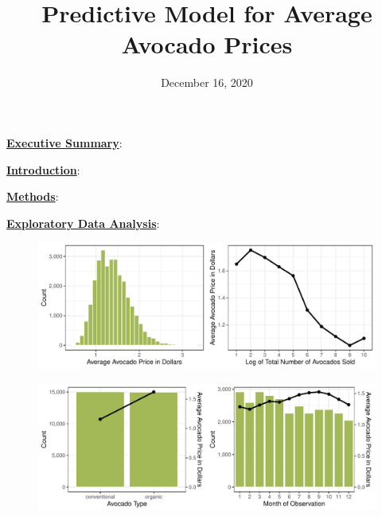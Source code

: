 \documentclass[11pt]{article}\usepackage[]{graphicx}\usepackage[]{color}
\title{Predictive Model for Average Avocado Prices\vspace{-5ex}}
\date{December 16, 2020\vspace{-5ex}}
\makeatletter
\def\maxwidth{ %
  \ifdim\Gin@nat@width>\linewidth
    \linewidth
  \else
    \Gin@nat@width
  \fi
}
\makeatother
\begin{document}
 
\maketitle
\hfill \break
















\noindent\textbf{\underline{Executive Summary}}:      
\hfill \break

\noindent\textbf{\underline{Introduction}}: 
\hfill \break

\noindent\textbf{\underline{Methods}}: 
\hfill \break

\noindent\textbf{\underline{Exploratory Data Analysis}}:  

\begin{figure}[h!] 
\begin{center}

\includegraphics[width=\maxwidth]{figure/unnamed-chunk-1-1} 

\caption{}
\label{explore1}
\end{center} 
\end{figure}


\begin{figure}[h!] 
\begin{center}

\includegraphics[width=\maxwidth]{figure/unnamed-chunk-2-1} 

\caption{}
\label{explore2}
\end{center} 
\end{figure}
\end{document}
